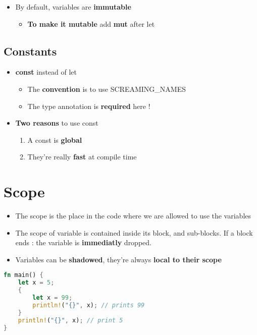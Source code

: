 \documentclass{report}
\begin{document}
\begin{itemize}
	\item By default, variables are \textbf{immutable} 
		\begin{itemize}
			\item \textbf{To make it mutable} add \textbf{mut} after let
		\end{itemize}
\end{itemize}

\subsection{Constants}

\begin{itemize}
	\item \textbf{const} instead of let
		\begin{itemize}
			\item The \textbf{convention} is to use SCREAMING\_NAMES 
			\item The type annotation is \textbf{required} here !
		\end{itemize}
	\item \textbf{Two reasons} to use const
		\begin{enumerate}
			\item A const is \textbf{global}  
			\item They're really \textbf{fast} at compile time
		\end{enumerate}
\end{itemize}


\section{Scope}

\begin{itemize}
	\item The scope is the place in the code where we are allowed to use the variables 
	\item The scope of variable is contained inside its block, and sub-blocks. If a block ends : the variable is \textbf{immediatly} dropped. 
	\item Variables can be \textbf{shadowed}, they're always \textbf{local to their scope}  
\end{itemize}

\begin{tcolorbox}[title=Shadowing,colback=backcolour]
\begin{lstlisting}[language=rust]
fn main() {
	let x = 5;
	{
		let x = 99;
		println!("{}", x); // prints 99
	}
	println!("{}", x); // print 5
}
\end{lstlisting}
\end{tcolorbox}
\end{document}

